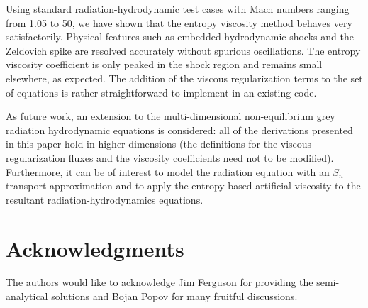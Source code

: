 \documentclass[review]{elsarticle}
\begin{document}
Using standard radiation-hydrodynamic test cases with Mach numbers ranging from 1.05 to 50, we have shown that the entropy viscosity method behaves very satisfactorily. Physical features such as embedded hydrodynamic shocks and the Zeldovich spike are resolved accurately without spurious oscillations. The entropy viscosity coefficient is only peaked in the shock region and remains small elsewhere, as expected. 
The addition of the viscous regularization terms to the set of equations is rather straightforward to implement in an existing code.

As future work, an extension to the multi-dimensional non-equilibrium grey radiation hydrodynamic equations is considered: all of the derivations presented in this paper hold in higher dimensions (the definitions for the viscous regularization fluxes and the viscosity coefficients need not to be modified). Furthermore, it can be of interest to model the radiation equation with an $S_n$ transport approximation and to apply the entropy-based artificial viscosity to the resultant radiation-hydrodynamics equations. 

\section*{Acknowledgments}
The authors would like to acknowledge Jim Ferguson for providing the semi-analytical solutions and Bojan Popov for many fruitful discussions. 
\end{document}

